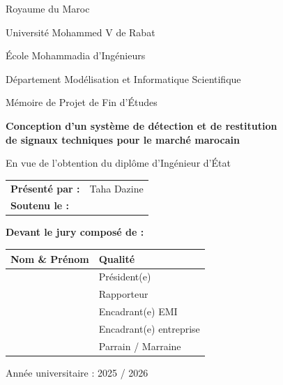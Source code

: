 ﻿\begin{titlepage}
\centering

{\large Royaume du Maroc\par}
{\large Université Mohammed V de Rabat\par}
{\large École Mohammadia d'Ingénieurs\par}
{\large Département Modélisation et Informatique Scientifique\par}

\vspace{2cm}
{\Large Mémoire de Projet de Fin d'Études\par}
\vspace{1cm}

{\LARGE\bfseries
Conception d'un système de détection et de restitution\\
de signaux techniques pour le marché marocain\par}

\vspace{1.5cm}
{\large En vue de l'obtention du diplôme d'Ingénieur d'État\par}
\vspace{1.5cm}

\begin{tabular}{ll}
\textbf{Présenté par :} & Taha Dazine \\
\textbf{Soutenu le :} & \dotfill
\end{tabular}

\vspace{1.5cm}
\textbf{Devant le jury composé de :}

\vspace{0.5cm}
\begin{tabular}{|p{6cm}|p{5cm}|}
\hline
Nom \& Prénom & Qualité \\
\hline
\dotfill & Président(e) \\
\hline
\dotfill & Rapporteur \\
\hline
\dotfill & Encadrant(e) EMI \\
\hline
\dotfill & Encadrant(e) entreprise \\
\hline
\dotfill & Parrain / Marraine \\
\hline
\end{tabular}

\vfill
{\large Année universitaire : 2025 / 2026\par}
\end{titlepage}

